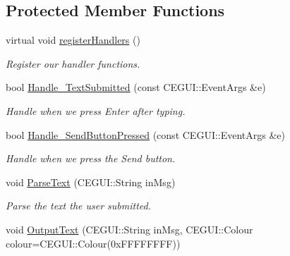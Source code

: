 \subsection*{Protected Member Functions}
\begin{DoxyCompactItemize}
\item 
virtual void \hyperlink{class_n_c_t_u_1_1_game_console_window_a6274ef02dd735e8df10f6d5349d88ddc}{register\+Handlers} ()\hypertarget{class_n_c_t_u_1_1_game_console_window_a6274ef02dd735e8df10f6d5349d88ddc}{}\label{class_n_c_t_u_1_1_game_console_window_a6274ef02dd735e8df10f6d5349d88ddc}

\begin{DoxyCompactList}\small\item\em Register our handler functions. \end{DoxyCompactList}\item 
bool \hyperlink{class_n_c_t_u_1_1_game_console_window_a5b981f9d624d03c1bb265c974b5a6608}{Handle\+\_\+\+Text\+Submitted} (const C\+E\+G\+U\+I\+::\+Event\+Args \&e)\hypertarget{class_n_c_t_u_1_1_game_console_window_a5b981f9d624d03c1bb265c974b5a6608}{}\label{class_n_c_t_u_1_1_game_console_window_a5b981f9d624d03c1bb265c974b5a6608}

\begin{DoxyCompactList}\small\item\em Handle when we press Enter after typing. \end{DoxyCompactList}\item 
bool \hyperlink{class_n_c_t_u_1_1_game_console_window_a373ef277c17527289fc93dac39d95800}{Handle\+\_\+\+Send\+Button\+Pressed} (const C\+E\+G\+U\+I\+::\+Event\+Args \&e)\hypertarget{class_n_c_t_u_1_1_game_console_window_a373ef277c17527289fc93dac39d95800}{}\label{class_n_c_t_u_1_1_game_console_window_a373ef277c17527289fc93dac39d95800}

\begin{DoxyCompactList}\small\item\em Handle when we press the Send button. \end{DoxyCompactList}\item 
void \hyperlink{class_n_c_t_u_1_1_game_console_window_a6518b335a1091432dca37abef7fea6e1}{Parse\+Text} (C\+E\+G\+U\+I\+::\+String in\+Msg)\hypertarget{class_n_c_t_u_1_1_game_console_window_a6518b335a1091432dca37abef7fea6e1}{}\label{class_n_c_t_u_1_1_game_console_window_a6518b335a1091432dca37abef7fea6e1}

\begin{DoxyCompactList}\small\item\em Parse the text the user submitted. \end{DoxyCompactList}\item 
void \hyperlink{class_n_c_t_u_1_1_game_console_window_a2343eb496dd5be2a4bfe2c13d9530069}{Output\+Text} (C\+E\+G\+U\+I\+::\+String in\+Msg, C\+E\+G\+U\+I\+::\+Colour colour=C\+E\+G\+U\+I\+::\+Colour(0x\+F\+F\+F\+F\+F\+F\+F\+F))\hypertarget{class_n_c_t_u_1_1_game_console_window_a2343eb496dd5be2a4bfe2c13d9530069}{}\label{class_n_c_t_u_1_1_game_console_window_a2343eb496dd5be2a4bfe2c13d9530069}


\end{DoxyCompactItemize}
